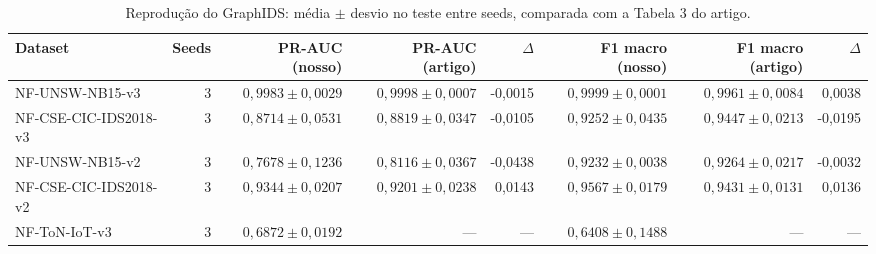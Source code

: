 \begin{table}[ht]
\centering
\caption{Reprodução do GraphIDS: média $\pm$ desvio no teste entre seeds, comparada com a Tabela 3 do artigo.}
\label{tab:reproducao}
\begin{tabular}{lrrrrrrr}
\toprule
Dataset & Seeds & PR-AUC (nosso) & PR-AUC (artigo) & $\Delta$ & F1 macro (nosso) & F1 macro (artigo) & $\Delta$ \\
\midrule
NF-UNSW-NB15-v3 & 3 & $0,9983 \pm 0,0029$ & $0,9998 \pm 0,0007$ & -0,0015 & $0,9999 \pm 0,0001$ & $0,9961 \pm 0,0084$ & 0,0038 \\
NF-CSE-CIC-IDS2018-v3 & 3 & $0,8714 \pm 0,0531$ & $0,8819 \pm 0,0347$ & -0,0105 & $0,9252 \pm 0,0435$ & $0,9447 \pm 0,0213$ & -0,0195 \\
NF-UNSW-NB15-v2 & 3 & $0,7678 \pm 0,1236$ & $0,8116 \pm 0,0367$ & -0,0438 & $0,9232 \pm 0,0038$ & $0,9264 \pm 0,0217$ & -0,0032 \\
NF-CSE-CIC-IDS2018-v2 & 3 & $0,9344 \pm 0,0207$ & $0,9201 \pm 0,0238$ & 0,0143 & $0,9567 \pm 0,0179$ & $0,9431 \pm 0,0131$ & 0,0136 \\
NF-ToN-IoT-v3 & 3 & $0,6872 \pm 0,0192$ & — & — & $0,6408 \pm 0,1488$ & — & — \\
\bottomrule
\end{tabular}
\end{table}
